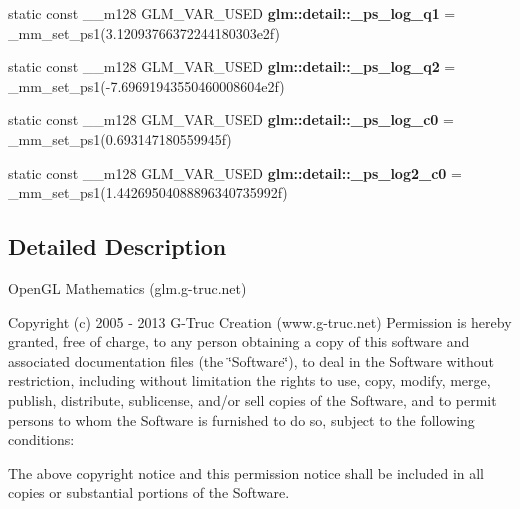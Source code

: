 \begin{DoxyCompactItemize}
\item 
\hypertarget{namespaceglm_1_1detail_ac0c6db029b1fa2b837a3a792040d2aeb}{}static const \+\_\+\+\_\+m128 G\+L\+M\+\_\+\+V\+A\+R\+\_\+\+U\+S\+E\+D {\bfseries glm\+::detail\+::\+\_\+ps\+\_\+log\+\_\+q1} = \+\_\+mm\+\_\+set\+\_\+ps1(3.\+12093766372244180303e2f)\label{namespaceglm_1_1detail_ac0c6db029b1fa2b837a3a792040d2aeb}

\item 
\hypertarget{namespaceglm_1_1detail_a26db45cb0a4921394f3ac5b72e961aac}{}static const \+\_\+\+\_\+m128 G\+L\+M\+\_\+\+V\+A\+R\+\_\+\+U\+S\+E\+D {\bfseries glm\+::detail\+::\+\_\+ps\+\_\+log\+\_\+q2} = \+\_\+mm\+\_\+set\+\_\+ps1(-\/7.\+69691943550460008604e2f)\label{namespaceglm_1_1detail_a26db45cb0a4921394f3ac5b72e961aac}

\item 
\hypertarget{namespaceglm_1_1detail_abc488823172c365f7435926b842186a4}{}static const \+\_\+\+\_\+m128 G\+L\+M\+\_\+\+V\+A\+R\+\_\+\+U\+S\+E\+D {\bfseries glm\+::detail\+::\+\_\+ps\+\_\+log\+\_\+c0} = \+\_\+mm\+\_\+set\+\_\+ps1(0.\+693147180559945f)\label{namespaceglm_1_1detail_abc488823172c365f7435926b842186a4}

\item 
\hypertarget{namespaceglm_1_1detail_aea777797bb8e540566b6e5d66c06cdbf}{}static const \+\_\+\+\_\+m128 G\+L\+M\+\_\+\+V\+A\+R\+\_\+\+U\+S\+E\+D {\bfseries glm\+::detail\+::\+\_\+ps\+\_\+log2\+\_\+c0} = \+\_\+mm\+\_\+set\+\_\+ps1(1.\+44269504088896340735992f)\label{namespaceglm_1_1detail_aea777797bb8e540566b6e5d66c06cdbf}

\end{DoxyCompactItemize}


\subsection{Detailed Description}
Open\+G\+L Mathematics (glm.\+g-\/truc.\+net)

Copyright (c) 2005 -\/ 2013 G-\/\+Truc Creation (www.\+g-\/truc.\+net) Permission is hereby granted, free of charge, to any person obtaining a copy of this software and associated documentation files (the \char`\"{}\+Software\char`\"{}), to deal in the Software without restriction, including without limitation the rights to use, copy, modify, merge, publish, distribute, sublicense, and/or sell copies of the Software, and to permit persons to whom the Software is furnished to do so, subject to the following conditions\+:

The above copyright notice and this permission notice shall be included in all copies or substantial portions of the Software.

